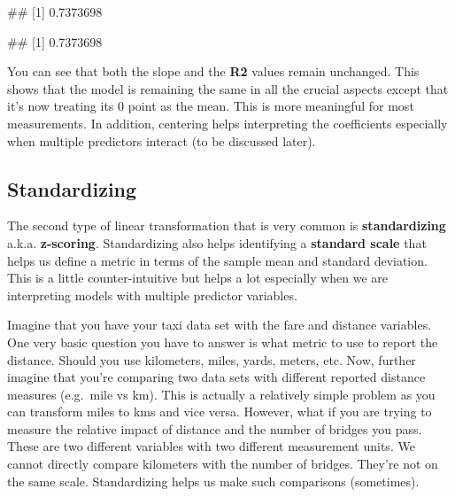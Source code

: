 \documentclass[
]{book}
\newenvironment{Shaded}{\begin{snugshade}}{\end{snugshade}}
\newcommand{\NormalTok}[1]{#1}
\begin{document}
\begin{Shaded}
\end{Shaded}

\begin{Shaded}
\begin{Highlighting}[]
\NormalTok{\#\# [1] 0.7373698}
\end{Highlighting}
\end{Shaded}

\begin{Shaded}
\begin{Highlighting}[]
\NormalTok{\#\# [1] 0.7373698}
\end{Highlighting}
\end{Shaded}

You can see that both the slope and the \textbf{R2} values remain unchanged. This shows that the model is remaining the same in all the crucial aspects except that it's now treating its 0 point as the mean. This is more meaningful for most measurements. In addition, centering helps interpreting the coefficients especially when multiple predictors interact (to be discussed later).

\hypertarget{standardizing}{%
\subsection{Standardizing}\label{standardizing}}

The second type of linear transformation that is very common is \textbf{standardizing} a.k.a. \textbf{z-scoring}. Standardizing also helps identifying a \textbf{standard scale} that helps us define a metric in terms of the sample mean and standard deviation. This is a little counter-intuitive but helps a lot especially when we are interpreting models with multiple predictor variables.

Imagine that you have your taxi data set with the fare and distance variables. One very basic question you have to answer is what metric to use to report the distance. Should you use kilometers, miles, yards, meters, etc. Now, further imagine that you're comparing two data sets with different reported distance measures (e.g.~mile vs km). This is actually a relatively simple problem as you can transform miles to kms and vice versa. However, what if you are trying to measure the relative impact of distance and the number of bridges you pass. These are two different variables with two different measurement units. We cannot directly compare kilometers with the number of bridges. They're not on the same scale. Standardizing helps us make such comparisons (sometimes).
\end{document}
